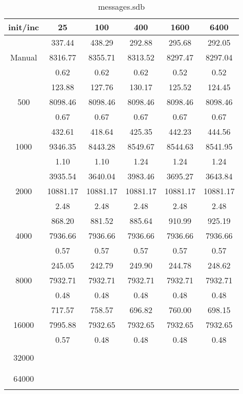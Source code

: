 \begin{table}[th]
\caption{messages.sdb}
\label{tab:messages.sdb}
\centering
\begin{tabular}{|c||c|c|c|c|c|}
\hline
init/inc & 25 & 100 & 400 & 1600 & 6400 \\ \hline \hline
       & 337.44  & 438.29  & 292.88  & 295.68  & 292.05 \\
Manual & 8316.77 & 8355.71 & 8313.52 & 8297.47 & 8297.04 \\
       & 0.62    & 0.62    & 0.62    & 0.52    & 0.52  \\ \hline
  & 123.88 & 127.76 & 130.17 & 125.52 & 124.45\\ 
500  & 8098.46 & 8098.46 & 8098.46 & 8098.46 & 8098.46\\ 
  & 0.67 & 0.67 & 0.67 & 0.67 & 0.67\\ \hline 
  & 432.61 & 418.64 & 425.35 & 442.23 & 444.56\\ 
1000  & 9346.35 & 8443.28 & 8549.67 & 8544.63 & 8541.95\\ 
  & 1.10 & 1.10 & 1.24 & 1.24 & 1.24\\ \hline 
  & 3935.54 & 3640.04 & 3983.46 & 3695.27 & 3643.84\\ 
2000  & 10881.17 & 10881.17 & 10881.17 & 10881.17 & 10881.17\\ 
  & 2.48 & 2.48 & 2.48 & 2.48 & 2.48\\ \hline 
  & 868.20 & 881.52 & 885.64 & 910.99 & 925.19\\ 
4000  & 7936.66 & 7936.66 & 7936.66 & 7936.66 & 7936.66\\ 
  & 0.57 & 0.57 & 0.57 & 0.57 & 0.57\\ \hline 
  & 245.05 & 242.79 & 249.90 & 244.78 & 248.62\\ 
8000  & 7932.71 & 7932.71 & 7932.71 & 7932.71 & 7932.71\\ 
  & 0.48 & 0.48 & 0.48 & 0.48 & 0.48\\ \hline 
  & 717.57 & 758.57 & 696.82 & 760.00 & 698.15\\ 
16000  & 7995.88 & 7932.65 & 7932.65 & 7932.65 & 7932.65\\ 
  & 0.57 & 0.48 & 0.48 & 0.48 & 0.48\\ \hline 
  &  &  &  &  & \\ 
32000  &  &  &  &  & \\ 
  &  &  &  &  & \\ \hline 
  &  &  &  &  & \\ 
64000  &  &  &  &  & \\ 
  &  &  &  &  & \\ \hline 
\end{tabular}
\end{table}

